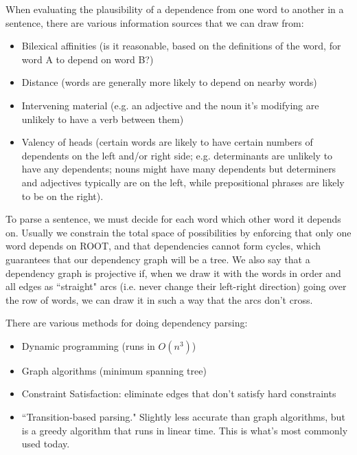 When evaluating the plausibility of a dependence from one word to another in a sentence, there are various information sources that we can draw from:
\begin{itemize}
\item Bilexical affinities (is it reasonable, based on the definitions of the word, for word A to depend on word B?)
\item Distance (words are generally more likely to depend on nearby words)
\item Intervening material (e.g. an adjective and the noun it's modifying are unlikely to have a verb between them)
\item Valency of heads (certain words are likely to have certain numbers of dependents on the left and/or right side; e.g. determinants are unlikely to have any dependents; nouns might have many dependents but determiners and adjectives typically are on the left, while prepositional phrases are likely to be on the right).
\end{itemize}

To parse a sentence, we must decide for each word which other word it depends on. Usually we constrain the total space of possibilities by enforcing that only one word depends on ROOT, and that dependencies cannot form cycles, which guarantees that our dependency graph will be a tree. We also say that a dependency graph is projective if, when we draw it with the words in order and all edges as ``straight" arcs (i.e. never change their left-right direction) going over the row of words, we can draw it in such a way that the arcs don't cross.

There are various methods for doing dependency parsing:
\begin{itemize}
\item Dynamic programming (runs in $O(n^3)$)
\item Graph algorithms (minimum spanning tree)
\item Constraint Satisfaction: eliminate edges that don't satisfy hard constraints
\item ``Transition-based parsing." Slightly less accurate than graph algorithms, but is a greedy algorithm that runs in linear time. This is what's most commonly used today.
\end{itemize}

